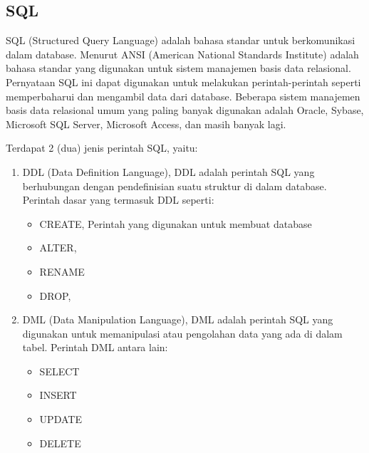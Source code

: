 \subsection{SQL}
SQL (Structured Query Language) adalah bahasa standar untuk berkomunikasi dalam database. Menurut ANSI (American National Standards Institute) adalah bahasa standar yang digunakan untuk sistem manajemen basis data relasional. Pernyataan SQL ini dapat digunakan untuk melakukan perintah-perintah seperti memperbaharui dan mengambil data dari database. Beberapa sistem manajemen basis data relasional umum yang paling banyak digunakan adalah Oracle, Sybase, Microsoft SQL Server, Microsoft Access, dan masih banyak lagi.
\par
Terdapat 2 (dua) jenis perintah SQL, yaitu:
\begin{enumerate}
\item DDL (Data Definition Language), DDL adalah perintah SQL yang berhubungan dengan pendefinisian suatu struktur di dalam database. Perintah dasar yang termasuk DDL seperti:

\begin{itemize}
\item CREATE, Perintah yang digunakan untuk membuat database
\item ALTER, 
\item RENAME
\item DROP, 
\end{itemize}

\item DML (Data Manipulation Language), DML adalah perintah SQL yang digunakan untuk memanipulasi atau pengolahan data yang ada di dalam tabel. Perintah DML antara lain:

\begin{itemize}
\item SELECT
\item INSERT
\item UPDATE
\item DELETE
\end{itemize}
\end{enumerate}

